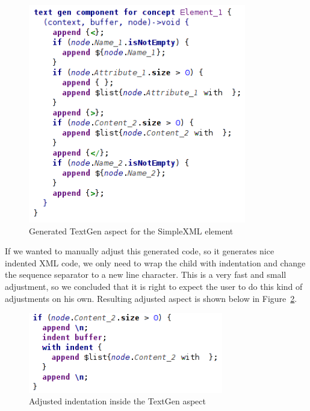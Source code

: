 \begin{figure}[h]
	\centering
	\includegraphics[width=95mm]{./img/textgen_final.png}
	\caption{Generated TextGen aspect for the SimpleXML element}
	\label{fig:textgen_final}
\end{figure}

If we wanted to manually adjust this generated code, so it generates nice indented XML code, we only need to wrap the  child with indentation and change the sequence separator to a new line character.
This is a very fast and small adjustment, so we concluded that it is right to expect the user to do this kind of adjustments on his own.
Resulting adjusted aspect is shown below in Figure~\ref{fig:textgen_adjusted}.

\begin{figure}[!ht]
	\centering
	\includegraphics[width=85mm]{./img/textgen_adjusted.png}
	\caption{Adjusted indentation inside the TextGen aspect}
	\label{fig:textgen_adjusted}
\end{figure}